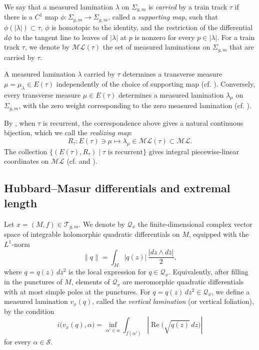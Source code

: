 \documentclass[dvipdfmx]{amsart}
\theoremstyle{remark}
\newcommand{\teich}{\mathcal{T}}
\newcommand{\ml}{\mathcal{ML}}
\begin{document}
We say that a measured lamination $\lambda$ on $\Sigma_{g,m}$ is \emph{carried} by a train track $\tau$ if there is a $C^1$ map $\phi\colon \Sigma_{g,m}\to \Sigma_{g,m}$, called a \emph{supporting map}, such that $\phi(|\lambda|)\subset \tau$, $\phi$ is homotopic to the identity, and the restriction of the differential $d\phi$ to the tangent line to leaves of $|\lambda|$ at $p$ is nonzero for every $p\in |\lambda|$. 
For a train track $\tau$, we denote by $\ml(\tau)$ the set of measured laminations on $\Sigma_{g,m}$ that are carried by $\tau$.

A measured lamination $\lambda$ carried by $\tau$ determines a transverse measure $\mu=\mu_\lambda\in E(\tau)$ independently of the choice of supporting map (cf. \cite[Proposition 1.7.5]{PennerHarer1992}).
Conversely, every transverse measure $\mu\in E(\tau)$ determines a measured lamination $\lambda_\mu$ on $\Sigma_{g,m}$, with the zero weight corresponding to the zero measured lamination (cf. \cite[Construction 1.7.7 and Corollary 2.7.3]{PennerHarer1992}).

By \cite[Theorem 2.7.4]{PennerHarer1992}, when $\tau$ is recurrent,
the correspondence above gives a natural continuous bijection, which we
call the \emph{realizing map}:
\begin{equation}
\label{eq:realizing_map}
R_\tau\colon E(\tau)\ni \mu\mapsto \lambda_\mu\in \ml(\tau)\subset \ml.
\end{equation}
The collection $\{(E(\tau),R_\tau)\mid \text{$\tau$ is recurrent}\}$ gives integral piecewise-linear coordinates on $\ml$ (cf. \cite[Proposition 9.5.8]{Thurston-LectureNote} and \cite[Theorem 3.1.4]{PennerHarer1992}).


\subsection{Hubbard--Masur differentials and extremal length}
\label{subsec:HMdiffExtremalLength}
Let $x=(M,f)\in\teich_{g,m}$.
We denote by $\mathcal{Q}_x$ the finite-dimensional complex
vector space of integrable holomorphic quadratic
differentials on $M$, equipped with the $L^1$-norm
\[
\|q\|=\int_M |q(z)|\,\frac{|dz\wedge d\overline{z}|}{2},
\]
where $q=q(z)\,dz^2$ is the local expression for
$q\in\mathcal{Q}_x$.
Equivalently, after filling in the punctures of $M$, elements of $\mathcal{Q}_x$ are meromorphic quadratic differentials with at most simple poles at the punctures.
For $q=q(z)\,dz^2\in\mathcal{Q}_x$, we define a measured lamination $v_x(q)$, called the \emph{vertical lamination} (or vertical foliation), by the condition
\[
i\bigl(v_x(q),\alpha\bigr)
=
\inf_{\alpha'\in\alpha}
\int_{f(\alpha')}
\left|\operatorname{Re}\bigl(\sqrt{q(z)}\,dz\bigr)\right|
\]
for every $\alpha\in\mathcal{S}$.
\end{document}
